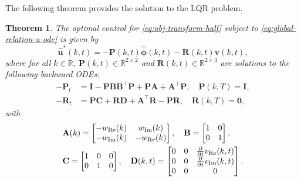\documentclass[journal,twoside,web]{ieeecolor}
\newtheorem{theorem}{Theorem}
\newcommand{\RR}{\mathbb{R}}
\newcommand{\state}{\phi}
\newcommand{\statehat}{\hat{\state}}
\begin{document}
The following theorem provides the solution to the LQR problem.
\begin{theorem}\label{theo}
	The optimal control for \eqref{eq:obj-transform-half}  subject to \eqref{eq:global-relation-u-ode} is given by
	\begin{equation}\label{eq:u-opt-theo}
		\boldsymbol{\hat{u}}^*(k,t) = - \mathbf{P}(k,t)\boldsymbol{\statehat}(k,t) - \mathbf{R}(k,t)\boldsymbol{v}(k,t),
	\end{equation}
where for all $k\in\RR$, $\mathbf{P}(k,t)\in\RR^{2\times2}$ and $\mathbf{R}(k,t)\in\RR^{2\times3}$ are solutions to the following backward ODEs:
	\begin{align}
		-\mathbf{P}_t &= \mathbf{I - PBB^\top P + PA + A^\top P}, \quad\mathbf{P}(k,T) = \mathbf{I}, \label{eq:opt-law-p}\\
		-\mathbf{R}_t&=\mathbf{PC + RD + A^\top R - P R}, \quad \mathbf{R}(k,T) = \mathbf{0}, \label{eq:opt-law-r}
	\end{align} 
	with
	\begin{align*}
		&\mathbf{A}(k) = \begin{bmatrix}
			-w_{\text{Re}}(k) & w_{\text{Im}}(k) \\ -w_{\text{Im}}(k) & -w_{\text{Re}}(k)
		\end{bmatrix},\quad \mathbf{B} = \begin{bmatrix}
			1 & 0 \\ 0 & 1
		\end{bmatrix},\ \\
		&\mathbf{C} = \begin{bmatrix}
			1 & 0 & 0 \\ 0 & 1 &0 
		\end{bmatrix},\quad
		\mathbf{D}(k,t) = \begin{bmatrix}
			0 & 0 & \pdv{}{t}v_{\text{Re}}(k,t) \\ 0 & 0 & \pdv{}{t}v_{\text{Im}}(k,t) \\ 0 & 0 & 0
		\end{bmatrix}.
	\end{align*}
\end{theorem}
\end{document}
